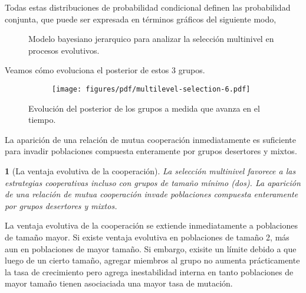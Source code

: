 \documentclass[a4paper,10pt]{article}
\newif\ifen
\newif\ifes
\newcommand{\en}[1]{\ifen#1\fi}
\newcommand{\es}[1]{\ifes#1\fi}
\newtheorem{conclution}{\en{Conclution}\es{Conclusión}}%
\begin{document}
Todas estas distribuciones de probabilidad condicional definen las probabilidad conjunta, que puede ser expresada en términos gráficos del siguiente modo,
%
\begin{figure}[H]
\centering
{}
\caption{
Modelo bayesiano jerarquico para analizar la selección multinivel en procesos evolutivos.
}
\label{fig:modelo_grafico}
\end{figure}
%
Veamos cómo evoluciona el posterior de estos 3 grupos.
%
\begin{figure}[H]
    \centering
    \begin{subfigure}[b]{0.66\textwidth}
    \texttt{[image: figures/pdf/multilevel-selection-6.pdf]}
    \end{subfigure}
    \caption{
    Evolución del posterior de los grupos a medida que avanza en el tiempo.
    }
    \label{fig:multilevel-selection-6}
\end{figure}
%
La aparición de una relación de mutua cooperación inmediatamente es suficiente para invadir poblaciones compuesta enteramente por grupos desertores y mixtos.
%
\begin{conclution}[La ventaja evolutiva de la cooperación]
La selección multinivel favorece a las estrategias cooperativas incluso con grupos de tamaño mínimo (dos).
La aparición de una relación de mutua cooperación invade poblaciones compuesta enteramente por grupos desertores y mixtos.
\end{conclution}
%
La ventaja evolutiva de la cooperación se extiende inmediatamente a poblaciones de tamaño mayor.
Si existe ventaja evolutiva en poblaciones de tamaño 2, más aun en poblaciones de mayor tamaño.
Si embargo, exisite un límite debido a que luego de un cierto tamaño, agregar miembros al grupo no aumenta prácticamente 
la tasa de crecimiento pero agrega inestabilidad interna en tanto poblaciones de mayor tamaño tienen asociaciada una mayor tasa de mutación.
\end{document}
